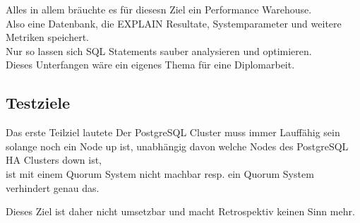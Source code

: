 \begin{flushleft}
    Alles in allem bräuchte es für diesesn Ziel ein Performance Warehouse.\\
    Also eine Datenbank, die EXPLAIN Resultate, Systemparameter und weitere Metriken speichert.\\
    Nur so lassen sich SQL Statements sauber analysieren und optimieren.\\
    Dieses Unterfangen wäre ein eigenes Thema für eine Diplomarbeit.
    \subsection{Testziele}
    Das erste Teilziel lautete \guillemotleft Der PostgreSQL Cluster muss immer Lauffähig sein solange noch ein Node up ist, unabhängig davon welche Nodes des PostgreSQL HA Clusters down ist\guillemotright,\\
    ist mit einem \Gls{Quorum} System nicht machbar resp. ein \Gls{Quorum} System verhindert genau das.
\end{flushleft}
\begin{flushleft}
    Dieses Ziel ist daher nicht umsetzbar und macht Retrospektiv keinen Sinn mehr.
\end{flushleft}